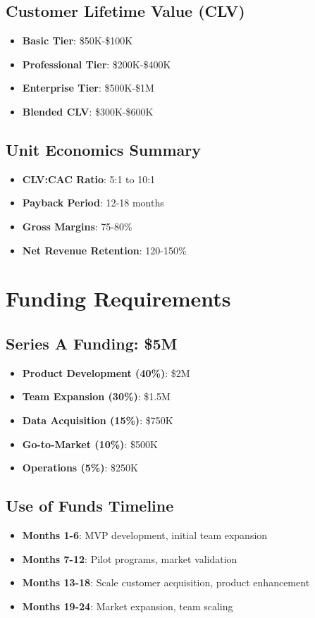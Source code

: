 \documentclass[business]{../templates/infraradar-main}
\begin{document}
\subsection{Customer Lifetime Value (CLV)}
\begin{itemize}
    \item \textbf{Basic Tier}: \$50K-\$100K
    \item \textbf{Professional Tier}: \$200K-\$400K
    \item \textbf{Enterprise Tier}: \$500K-\$1M
    \item \textbf{Blended CLV}: \$300K-\$600K
\end{itemize}

\subsection{Unit Economics Summary}
\begin{itemize}
    \item \textbf{CLV:CAC Ratio}: 5:1 to 10:1
    \item \textbf{Payback Period}: 12-18 months
    \item \textbf{Gross Margins}: 75-80\%
    \item \textbf{Net Revenue Retention}: 120-150\%
\end{itemize}

\section{Funding Requirements}

\subsection{Series A Funding: \$5M}
\begin{itemize}
    \item \textbf{Product Development (40\%)}: \$2M
    \item \textbf{Team Expansion (30\%)}: \$1.5M
    \item \textbf{Data Acquisition (15\%)}: \$750K
    \item \textbf{Go-to-Market (10\%)}: \$500K
    \item \textbf{Operations (5\%)}: \$250K
\end{itemize}

\subsection{Use of Funds Timeline}
\begin{itemize}
    \item \textbf{Months 1-6}: MVP development, initial team expansion
    \item \textbf{Months 7-12}: Pilot programs, market validation
    \item \textbf{Months 13-18}: Scale customer acquisition, product enhancement
    \item \textbf{Months 19-24}: Market expansion, team scaling
\end{itemize}
\end{document}
